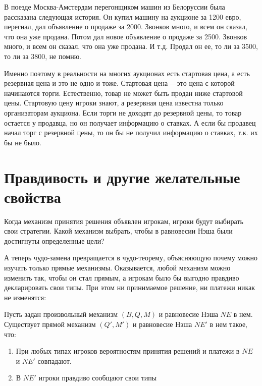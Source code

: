 В поезде Москва-Амстердам перегонщиком машин из Белоруссии была рассказана следующая история. Он купил машину на аукционе за 1200 евро, перегнал, дал объявление о продаже за 2000. Звонков много, и всем он сказал, что она уже продана. Потом дал новое  объявление о продаже за 2500. Звонков много, и всем он сказал, что она уже продана. И т.д. Продал он ее, то ли за 3500, то ли за 3800, не помню.

Именно поэтому в реальности на многих аукционах есть стартовая цена, а есть резервная цена и это не одно и тоже. Стартовая цена ---это цена с которой начинаются торги. Естественно, товар не может быть продан ниже стартовой цены. Стартовую цену игроки знают, а резервная цена известна только организаторам аукциона. Если торги не доходят до резервной цены, то товар остается у продавца, но он получает информацию о ставках. А если бы продавец начал торг с резервной цены, то он бы не получил информацию о ставках, т.к. их бы не было.


\section{Правдивость и другие желательные свойства}

Когда механизм принятия решения объявлен игрокам, игроки будут выбирать свои стратегии. Какой механизм выбрать, чтобы в равновесии Нэша были достигнуты определенные цели?

А теперь чудо-замена превращается в чудо-теорему, объясняющую почему можно изучать только прямые механизмы. Оказывается, любой механизм можно изменить так, чтобы он стал прямым, а игрокам было бы выгодно правдиво декларировать свои типы. При этом ни принимаемое решение, ни платежи никак не изменятся:

\begin{myth} \label{revelation_principle}
Пусть задан произвольный механизм $ (B,Q,M) $ и равновесие Нэша $NE$ в нем. Существует прямой механизм $ (Q',M') $ и равновесие Нэша $NE'$ в нем такое, что:
\begin{enumerate}
\item При любых типах игроков вероятностям принятия решений и платежи в $ NE $ и $ NE' $ совпадают.
\item В $ NE' $ игроки правдиво сообщают свои типы
\end{enumerate}
\end{myth}

